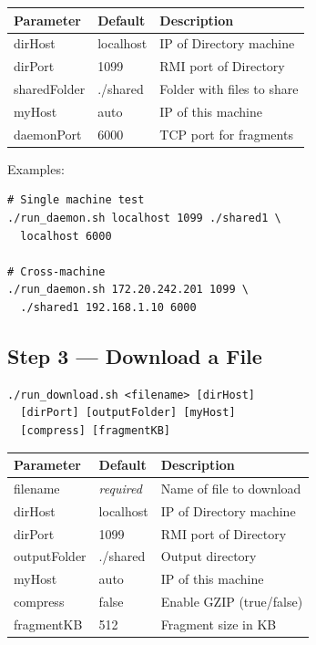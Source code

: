 \documentclass[10pt,twocolumn,a4paper]{article}
\begin{document}
\begin{table}[H]
\centering\scriptsize
\begin{tabular}{@{}lll@{}}
\toprule
\textbf{Parameter} & \textbf{Default} & \textbf{Description} \\
\midrule
dirHost      & localhost & IP of Directory machine \\
dirPort      & 1099      & RMI port of Directory \\
sharedFolder & ./shared  & Folder with files to share \\
myHost       & auto      & IP of this machine \\
daemonPort   & 6000      & TCP port for fragments \\
\bottomrule
\end{tabular}
\end{table}

Examples:
\begin{lstlisting}
# Single machine test
./run_daemon.sh localhost 1099 ./shared1 \
  localhost 6000

# Cross-machine
./run_daemon.sh 172.20.242.201 1099 \
  ./shared1 192.168.1.10 6000
\end{lstlisting}

\subsection{Step 3 --- Download a File}
\begin{lstlisting}
./run_download.sh <filename> [dirHost]
  [dirPort] [outputFolder] [myHost]
  [compress] [fragmentKB]
\end{lstlisting}

\begin{table}[H]
\centering\scriptsize
\begin{tabular}{@{}lll@{}}
\toprule
\textbf{Parameter} & \textbf{Default} & \textbf{Description} \\
\midrule
filename     & \textit{required} & Name of file to download \\
dirHost      & localhost & IP of Directory machine \\
dirPort      & 1099      & RMI port of Directory \\
outputFolder & ./shared  & Output directory \\
myHost       & auto      & IP of this machine \\
compress     & false     & Enable GZIP (true/false) \\
fragmentKB   & 512       & Fragment size in KB \\
\bottomrule
\end{tabular}
\end{table}
\end{document}
